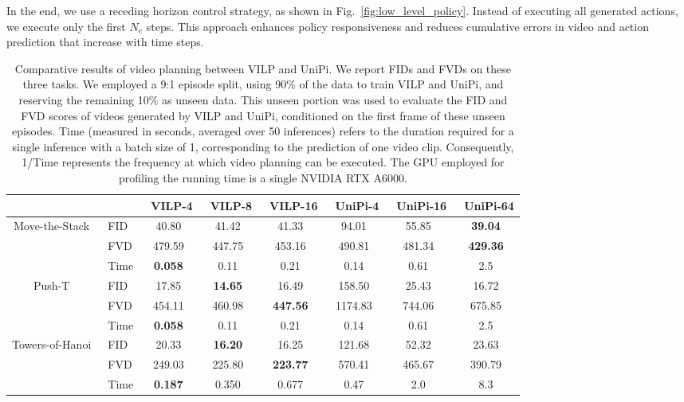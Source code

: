 \documentclass[doublecolumn]{IEEEtran}
\begin{document}
In the end, we use a receding horizon control strategy, as shown in Fig.~\ref{fig:low_level_policy}. Instead of executing all generated actions, we execute only the first \(N_e\) steps. This approach enhances policy responsiveness and reduces cumulative errors in video and action prediction that increase with time steps.




\begin{table*}[t]
\centering
{
\begin{tabular}{cl|ccc|ccc}
\hline
 & & \ {VILP-4} & \ {VILP-8} & \ {VILP-16} &\ {UniPi-4} & \ {UniPi-16} & \ {UniPi-64} \\
\hline
\multirow{2}{*}{{Move-the-Stack}} & \ {FID} & 40.80 & 41.42 & 41.33 & 94.01 & 55.85 & \textbf{39.04}\\
                                   & \ {FVD} &479.59& 447.75 & 453.16 & 490.81& 481.34& \textbf{429.36}\\
                                  & \ {Time} & \textbf{0.058} &0.11 & 0.21 & 0.14 & 0.61 & 2.5 \\
\hline
\multirow{2}{*}{{Push-T}}         & \ {FID} & 17.85  &\textbf{14.65} & 16.49  & 158.50 & 25.43 & 16.72 \\
                                  & \ {FVD} & 454.11 & 460.98 & \textbf{447.56} & 1174.83 & 744.06 &675.85\\
                                  & \ {Time} & \textbf{0.058} & 0.11 & 0.21 &0.14 & 0.61 &2.5 \\
\hline
\multirow{2}{*}{{Towers-of-Hanoi}} & \ {FID} &20.33 & \textbf{16.20} & 16.25 & 121.68 & 52.32 & 23.63 \\
                                   & \ {FVD} &249.03&225.80 & \textbf{223.77} &570.41& 465.67 & 390.79 \\
                                   & \ {Time} & \textbf{0.187} & 0.350 & 0.677 & 0.47 & 2.0 & 8.3 \\
\hline
\end{tabular}
}
\caption{Comparative results of video planning between VILP and UniPi. {We report FIDs and FVDs \cite{yan2021videogpt} on these three tasks.  We employed a 9:1 episode split, using 90\% of the data to train VILP and UniPi, and reserving the remaining 10\% as unseen data. This unseen portion was used to evaluate the FID and FVD scores of videos generated by VILP and UniPi, conditioned on the first frame of these unseen episodes. } Time (measured in seconds, averaged over 50 inferences) refers to the duration required for a single inference with a batch size of 1, corresponding to the prediction of one video clip. Consequently, 1/Time represents the frequency at which video planning can be executed. {The GPU employed for profiling the running time is a single NVIDIA RTX A6000.}}
\label{tab:video_planning}
\end{table*}
\end{document}
